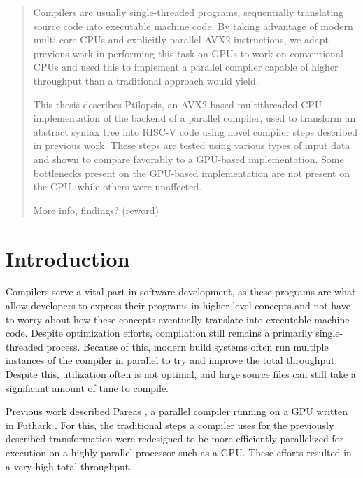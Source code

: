 \documentclass[12pt,dvipsnames]{article}
\newcommand{\helpme}[1]{{\color{red}#1}}
\begin{document}


\begin{abstract}
\noindent
Compilers are usually single-threaded programs, sequentially translating source code into executable machine code. By taking advantage of modern multi-core CPUs and explicitly parallel AVX2 instructions, we adapt previous work in performing this task on GPUs to work on conventional CPUs and used this to implement a parallel compiler capable of higher throughput than a traditional approach would yield.

This thesis describes Ptilopsis, an AVX2-based multithreaded CPU implementation of the backend of a parallel compiler, used to transform an abstract syntax tree into RISC-V code using novel compiler steps described in previous work. These steps are tested using various types of input data and shown to compare favorably to a GPU-based implementation. Some bottlenecks present on the GPU-based implementation are not present on the CPU, while others were unaffected.

\helpme{More info, findings? (reword)}

\end{abstract}

\newpage

\thispagestyle{empty}
\tableofcontents
\thispagestyle{empty}

\clearpage
\setcounter{page}{1}

\section{Introduction} \label{introduction}
Compilers serve a vital part in software development, as these programs are what allow developers to express their programs in higher-level concepts and not have to worry about how these concepts eventually translate into executable machine code. Despite optimization efforts, compilation still remains a primarily single-threaded process. Because of this, modern build systems often run multiple instances of the compiler in parallel to try and improve the total throughput. Despite this, utilization often is not optimal, and large source files can still take a significant amount of time to compile.

Previous work described Pareas \cite{voetter2021} \cite{huijben2021} \cite{pareas22}, a parallel compiler running on a GPU written in Futhark \cite{futhark}. For this, the traditional steps a compiler uses for the previously described transformation were redesigned to be more efficiently parallelized for execution on a highly parallel processor such as a GPU. These efforts resulted in a very high total throughput.
\end{document}
